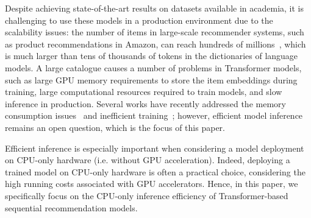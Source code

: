 \documentclass[sigconf,natbib=true, review=true]{acmart} %
\newcommand{\rsasha}[1]{\textcolor[HTML]{FF0000}{#1}}
\begin{document}
 Despite achieving state-of-the-art results on \rsasha{datasets available in academia}, it is challenging to use these models in a production environment due to the scalability issues: the number of items in large-scale recommender systems, such as product recommendations in Amazon, can reach hundreds of millions~\cite{AmazonStatisticsUptoDate}, which is much larger than tens of thousands of tokens in the dictionaries of language models. A large catalogue causes a number of problems in Transformer models, such as large GPU memory requirements to store the item embeddings \rsasha{during training}, large computational resources required to train models, and slow inference in production. Several works have recently addressed the memory consumption issues~\cite{xiaEfficientOnDeviceSessionBased2023, petrovRecJPQTrainingLargeCatalogue2024} and inefficient training~\cite{klenitskiyTurningDrossGold2023, petrovGSASRecReducingOverconfidence2023, petrovRSSEffectiveEfficient2023}; however, efficient model inference remains an open question, which is the focus of this paper.

\rsasha{Efficient inference is especially important when considering a model deployment on CPU-only hardware (i.e. without GPU acceleration). Indeed, deploying a trained model on CPU-only hardware is often a practical choice, considering the high \rsasha{running} costs associated with GPU accelerators. 
Hence, in this paper, we specifically focus on the CPU-only inference efficiency of Transformer-based sequential recommendation models.}
\end{document}
